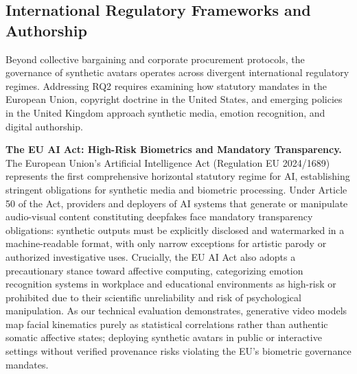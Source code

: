 \documentclass[pdflatex,sn-mathphys-num]{sn-jnl}
\theoremstyle{thmstyleone}
\theoremstyle{thmstyletwo}
\theoremstyle{thmstylethree}
\begin{document}
\subsection{International Regulatory Frameworks and Authorship}\label{subsec:regulatory}

Beyond collective bargaining and corporate procurement protocols, the governance of synthetic avatars operates across divergent international regulatory regimes. Addressing RQ2 requires examining how statutory mandates in the European Union, copyright doctrine in the United States, and emerging policies in the United Kingdom approach synthetic media, emotion recognition, and digital authorship.

\textbf{The EU AI Act: High-Risk Biometrics and Mandatory Transparency.} The European Union's Artificial Intelligence Act (Regulation EU 2024/1689)~\cite{euaiact2024} represents the first comprehensive horizontal statutory regime for AI, establishing stringent obligations for synthetic media and biometric processing. Under Article 50 of the Act, providers and deployers of AI systems that generate or manipulate audio-visual content constituting deepfakes face mandatory transparency obligations: synthetic outputs must be explicitly disclosed and watermarked in a machine-readable format, with only narrow exceptions for artistic parody or authorized investigative uses. Crucially, the EU AI Act also adopts a precautionary stance toward affective computing, categorizing emotion recognition systems in workplace and educational environments as high-risk or prohibited due to their scientific unreliability and risk of psychological manipulation. As our technical evaluation demonstrates, generative video models map facial kinematics purely as statistical correlations rather than authentic somatic affective states; deploying synthetic avatars in public or interactive settings without verified provenance risks violating the EU's biometric governance mandates.
\end{document}

